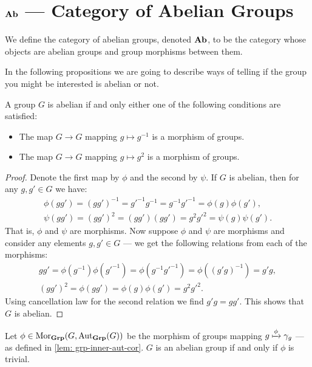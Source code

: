 \section{\texorpdfstring{\({\textbf{Ab}}\)}{Ab} --- Category of Abelian Groups}

\begin{definition}
We define the category of abelian groups, denoted \({\textbf{Ab}}\), to be the category
whose objects are abelian groups and group morphisms between them.
\end{definition}

In the following propositions we are going to describe ways of telling if the
group you might be interested is abelian or not.

\begin{proposition}
A group \(G\) is abelian if and only either one of the following conditions
are satisfied:
\begin{itemize}
  \setlength\itemsep{0em}
  \item The map \(G \to G\) mapping \(g \mapsto g^{-1}\) is a morphism of
    groups.
  \item The map \(G \to G\) mapping \(g \mapsto g^2\) is a morphism of groups.
\end{itemize}
\end{proposition}

\begin{proof}
Denote the first map by \(\phi\) and the second by \(\psi\). If \(G\) is
abelian, then for any \(g, g' \in G\) we have:
\begin{gather*}
  \phi(gg') = (gg')^{-1} = g'^{-1} g^{-1} = g^{-1}g'^{-1} = \phi(g) \phi(g'),
  \\
  \psi(gg') = (gg')^2 = (gg')(gg') = g^2g'^2 = \psi(g)\psi(g').
\end{gather*}
That is, \(\phi\) and \(\psi\) are morphisms. Now suppose \(\phi\) and
\(\psi\) are morphisms and consider any elements \(g, g' \in G\) --- we get
the following relations from each of the morphisms:
\begin{gather*}
  gg' = \phi(g^{-1})\phi(g'^{-1}) = \phi(g^{-1}g'^{-1})
  = \phi((g'g)^{-1}) = g'g,
  \\
  (gg')^2 = \phi(gg') = \phi(g) \phi(g') = g^2 g'^2.
\end{gather*}
Using cancellation law for the second relation we find \(g'g = gg'\). This
shows that \(G\) is abelian.
\end{proof}

\begin{proposition}
Let \(\phi \in \operatorname{Mor}_{\textbf{Grp}}(G, \operatorname{Aut}_{\textbf{Grp}}(G))\) be the morphism of groups mapping
\(g \xmapsto \phi \gamma_g\) --- as defined in \cref{lem: grp-inner-aut-cor}.
\(G\) is an abelian group if and only if \(\phi\) is trivial.
\end{proposition}

